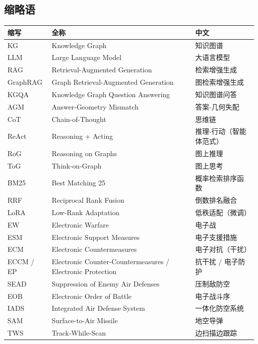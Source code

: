 \documentclass[12pt,a4paper]{ctexart}
\begin{document}
\subsection*{缩略语}

\begin{center}\small
\begin{tabular}{|p{}|p{}|p{}|}
\hline
\textbf{缩写} & \textbf{全称} & \textbf{中文} \\ \hline
KG & Knowledge Graph & 知识图谱 \\ \hline
LLM & Large Language Model & 大语言模型 \\ \hline
RAG & Retrieval-Augmented Generation & 检索增强生成 \\ \hline
GraphRAG & Graph Retrieval-Augmented Generation & 图检索增强生成 \\ \hline
KGQA & Knowledge Graph Question Answering & 知识图谱问答 \\ \hline
AGM & Answer-Geometry Mismatch & 答案-几何失配 \\ \hline
CoT & Chain-of-Thought & 思维链 \\ \hline
ReAct & Reasoning + Acting & 推理-行动（智能体范式） \\ \hline
RoG & Reasoning on Graphs & 图上推理 \\ \hline
ToG & Think-on-Graph & 图上思考 \\ \hline
BM25 & Best Matching 25 & 概率检索排序函数 \\ \hline
RRF & Reciprocal Rank Fusion & 倒数排名融合 \\ \hline
LoRA & Low-Rank Adaptation & 低秩适配（微调） \\ \hline
EW & Electronic Warfare & 电子战 \\ \hline
ESM & Electronic Support Measures & 电子支援措施 \\ \hline
ECM & Electronic Countermeasures & 电子对抗（干扰） \\ \hline
ECCM / EP & Electronic Counter-Countermeasures / Electronic Protection & 抗干扰 / 电子防护 \\ \hline
SEAD & Suppression of Enemy Air Defenses & 压制敌防空 \\ \hline
EOB & Electronic Order of Battle & 电子战斗序 \\ \hline
IADS & Integrated Air Defense System & 一体化防空系统 \\ \hline
SAM & Surface-to-Air Missile & 地空导弹 \\ \hline
TWS & Track-While-Scan & 边扫描边跟踪 \\ \hline

\end{tabular}
\end{center}
\end{document}

